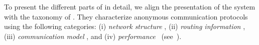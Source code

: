 
To present the different parts of \name in detail, 
we align the presentation of the system with the taxonomy of 
\textcite{RoutingSurveyAnonymousProtocols}.
They characterize anonymous communication protocols using the following 
categories: (i) \textit{network structure}%
, (ii) \textit{routing information}%
, (iii) \textit{communication model}%
, and (iv) \textit{performance}%
~(see~\cite[Table 1]{RoutingSurveyAnonymousProtocols}).




